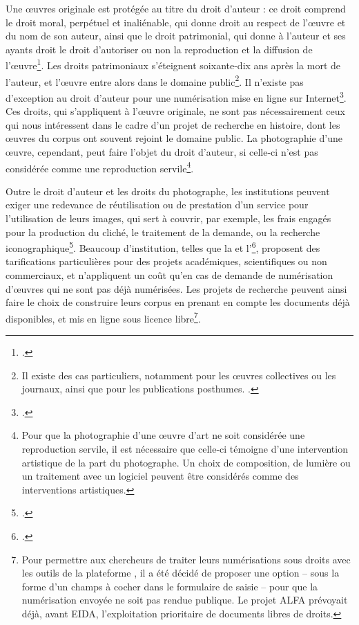 	Une œuvres originale est protégée au titre du droit d'auteur : ce droit comprend le droit moral, perpétuel et inaliénable, qui donne droit au respect de l'œuvre et du nom de son auteur, ainsi que le droit patrimonial, qui donne à l'auteur et ses ayants droit le droit d'autoriser ou non la reproduction et la diffusion de l'œuvre\footcite{sepetjanRespecterDroitPropriete2017}. Les droits patrimoniaux s'éteignent soixante-dix ans après la mort de l'auteur, et l'œuvre entre alors dans le domaine public\footnote{Il existe des cas particuliers, notamment pour les œuvres collectives ou les journaux, ainsi que pour les publications posthumes. \cite{GuidePratiquePour}.}. Il n'existe pas d'exception au droit d'auteur pour une numérisation mise en ligne sur Internet\footcite{sepetjanRespecterDroitPropriete2017}. Ces droits, qui s'appliquent à l'œuvre originale, ne sont pas nécessairement ceux qui nous intéressent dans le cadre d'un projet de recherche en histoire, dont les œuvres du corpus ont souvent rejoint le domaine public. La photographie d'une œuvre, cependant, peut faire l'objet du droit d'auteur, si celle-ci n'est pas considérée comme une reproduction servile\footnote{Pour que la photographie d'une œuvre d'art ne soit considérée une reproduction servile, il est nécessaire que celle-ci témoigne d'une intervention artistique de la part du photographe. Un choix de composition, de lumière ou un traitement avec un logiciel peuvent être considérés comme des interventions artistiques.}.
	
	Outre le droit d'auteur et les droits du photographe, les institutions peuvent exiger une redevance de réutilisation ou de prestation d'un service pour l'utilisation de leurs images, qui sert à couvrir, par exemple, les frais engagés pour la production du cliché, le traitement de la demande, ou la recherche iconographique\footcite{GuidePratiquePour}. Beaucoup d'institution, telles que la \bnf et l'\inha\footcite{denoyelleProposCoutImages2021}, proposent des tarifications particulières pour des projets académiques, scientifiques ou non commerciaux, et n'appliquent un coût qu'en cas de demande de numérisation d'œuvres qui ne sont pas déjà numérisées. Les projets de recherche peuvent ainsi faire le choix de construire leurs corpus en prenant en compte les documents déjà disponibles, et mis en ligne sous licence libre\footnote{Pour permettre aux chercheurs de traiter leurs numérisations sous droits avec les outils de la plateforme \eida, il a été décidé de proposer une option -- sous la forme d'un champs à cocher dans le formulaire de saisie -- pour que la numérisation envoyée ne soit pas rendue publique. Le projet ALFA prévoyait déjà, avant EIDA, l'exploitation prioritaire de documents libres de droits.}.

